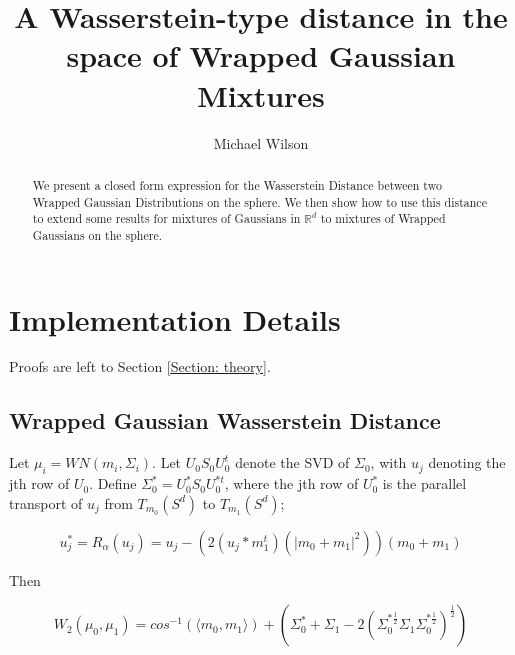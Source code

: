 \documentclass[]{article}
\title{A Wasserstein-type distance in the space of Wrapped Gaussian Mixtures}
\author{Michael Wilson}
\date{}
\begin{document}
	
	\maketitle
	
	\begin{abstract}
	We present a closed form expression for the Wasserstein Distance between two Wrapped Gaussian Distributions on the sphere. We then show how to use this distance to extend some results for mixtures of Gaussians in $\mathbb{R}^d$ to mixtures of Wrapped Gaussians on the sphere.  
	\end{abstract}


\section{Implementation Details}

Proofs are left to Section \ref{Section: theory}.

\subsection{Wrapped Gaussian Wasserstein Distance}

Let $\mu_i = WN(m_i,\Sigma_i)$. Let $U_0 S_0 U_0^t$ denote the SVD of $\Sigma_0$, with $u_j$ denoting the jth row of $U_0$. Define $\Sigma_0^* = U_0^* S_0 U_0^{*t}$, where the jth row of $U_0^*$ is the parallel transport of $u_j$ from $T_{m_0}(S^d)$ to $T_{m_1}(S^d)$;

%

\begin{equation*}
	u_j^{*} = R_\alpha(u_j) = u_j - (2(u_j*m_1^t)(|m_0 +m_1|^2))(m_0 + m_1)
\end{equation*} 

Then 

\begin{equation*}
	W_2(\mu_0,\mu_1) = cos^{-1}(\langle m_0,m_1 \rangle) + (\Sigma_0^* + \Sigma_1 - 2 (\Sigma_0^{*\frac{1}{2}} \Sigma_1 \Sigma_0^{*\frac{1}{2}})^{\frac{1}{2}}) 
\end{equation*}
\end{document}
